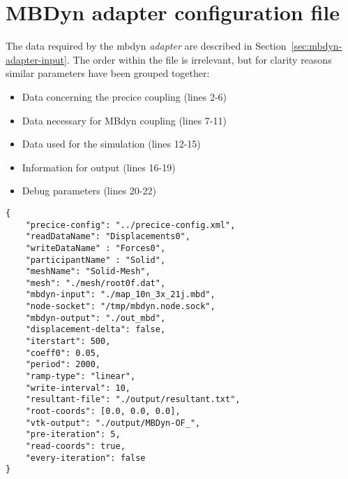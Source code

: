 \chapter{MBDyn adapter configuration file}
\label{app:mbd-config-file}

The data required by the \acrshort{mbdyn} \textit{adapter} are described in Section~\ref{sec:mbdyn-adapter-input}. The order within the file is irrelevant, but for clarity reasons similar parameters have been grouped together:

\begin{itemize}
	\item Data concerning the \acrshort{precice} coupling (lines 2-6)
	\item Data necessary for MBdyn coupling (lines 7-11) 
	\item Data used for the simulation (lines 12-15)
	\item Information for output (lines 16-19)
	\item Debug parameters (lines 20-22)
\end{itemize}


\lstset{language=json}
\begin{lstlisting}[caption=MBDyn adapter configuration file example, label=adapter-config]
{
	"precice-config": "../precice-config.xml",
	"readDataName": "Displacements0",
	"writeDataName" : "Forces0",
	"participantName" : "Solid",
	"meshName": "Solid-Mesh",
	"mesh": "./mesh/root0f.dat",
	"mbdyn-input": "./map_10n_3x_21j.mbd",
	"node-socket": "/tmp/mbdyn.node.sock",
	"mbdyn-output": "./out_mbd",
	"displacement-delta": false,
	"iterstart": 500,
	"coeff0": 0.05,
	"period": 2000,
	"ramp-type": "linear",
	"write-interval": 10,
	"resultant-file": "./output/resultant.txt",
	"root-coords": [0.0, 0.0, 0.0],
	"vtk-output": "./output/MBDyn-OF_",
	"pre-iteration": 5,
	"read-coords": true,
	"every-iteration": false
}
\end{lstlisting}